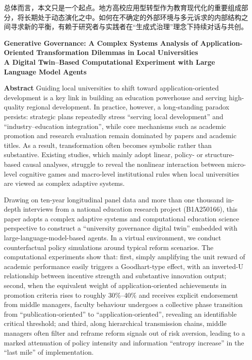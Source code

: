 \documentclass[UTF8, zihao=-4, fontset=mac]{ctexart}
\begin{document}
总体而言，本文只是一个起点。地方高校应用型转型作为教育现代化的重要组成部分，将长期处于动态演化之中。如何在不确定的外部环境与多元诉求的内部结构之间寻求新的平衡，有赖于研究者与实践者在“生成式治理”理念下持续对话与共创。




\clearpage
\begin{center}
\bfseries
Generative Governance: A Complex Systems Analysis of Application-Oriented Transformation Dilemmas in Local Universities\\[0.5em]
A Digital Twin–Based Computational Experiment with Large Language Model Agents
\end{center}

\vspace{0.8em}

\noindent{}\textbf{Abstract}\quad
Guiding local universities to shift toward application-oriented development is a key link in building an education powerhouse and serving high-quality regional development. In practice, however, a long-standing paradox persists: strategic plans repeatedly stress “serving local development” and “industry–education integration”, while core mechanisms such as academic promotion and research evaluation remain dominated by papers and academic titles. As a result, transformation often becomes symbolic rather than substantive. Existing studies, which mainly adopt linear, policy- or structure-based causal analyses, struggle to reveal the nonlinear interaction between micro-level cognitive games and macro-level institutional rules when local universities are viewed as complex adaptive systems.

Drawing on ten-year longitudinal panel data and more than one thousand in-depth interviews from a national education research project (B1A250166), this paper adopts a complex adaptive systems and computational education science perspective to construct a “university governance digital twin” embedded with large-language-model-based agents. In a virtual environment, we conduct counterfactual policy simulations around typical reform scenarios. The computational experiments show that: first, simply amplifying the unit reward of academic performance easily triggers a Goodhart-type effect, with an inverted-U relationship between incentive strength and substantive innovation output; second, when the equivalent weight of application-oriented achievements in promotion criteria rises to roughly 30\%–40\% and receives explicit endorsement from middle managers, faculty behaviour undergoes a collective phase transition from “publication-oriented” to “application-oriented”, revealing an identifiable critical threshold; and third, along hierarchical transmission chains, middle managers often filter and reframe reform signals out of risk aversion, leading to a marked attenuation of policy intensity and information “entropy increase” in the “last mile” of implementation.
\end{document}
